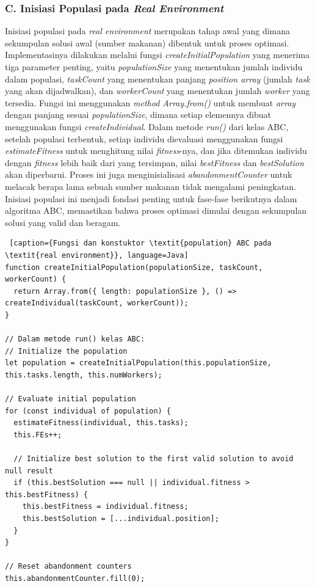 \subsubsection{C. Inisiasi Populasi pada \textit{Real Environment}}
Inisiasi populasi pada \textit{real environment} merupakan tahap awal yang dimana sekumpulan solusi awal (sumber makanan) dibentuk untuk proses optimasi. Implementasinya dilakukan melalui fungsi \textit{createInitialPopulation} yang menerima tiga parameter penting, yaitu \textit{populationSize} yang menentukan jumlah individu dalam populasi, \textit{taskCount} yang menentukan panjang \textit{position array} (jumlah \textit{task} yang akan dijadwalkan), dan \textit{workerCount} yang menentukan jumlah \textit{worker} yang tersedia. Fungsi ini menggunakan \textit{method Array.from()} untuk membuat \textit{array} dengan panjang sesuai \textit{populationSize}, dimana setiap elemennya dibuat menggunakan fungsi \textit{createIndividual}. Dalam metode \textit{run()} dari kelas ABC, setelah populasi terbentuk, setiap individu dievaluasi menggunakan fungsi \textit{estimateFitness} untuk menghitung nilai \textit{fitness}-nya, dan jika ditemukan individu dengan \textit{fitness} lebih baik dari yang tersimpan, nilai \textit{bestFitness} dan \textit{bestSolution} akan diperbarui. Proses ini juga menginisialisasi \textit{abandonmentCounter} untuk melacak berapa lama sebuah sumber makanan tidak mengalami peningkatan. Inisiasi populasi ini menjadi fondasi penting untuk fase-fase berikutnya dalam algoritma ABC, memastikan bahwa proses optimasi dimulai dengan sekumpulan solusi yang valid dan beragam.

\begin{lstlisting} [caption={Fungsi dan konstuktor \textit{population} ABC pada \textit{real environment}}, language=Java]
function createInitialPopulation(populationSize, taskCount, workerCount) {
  return Array.from({ length: populationSize }, () => createIndividual(taskCount, workerCount));
}

// Dalam metode run() kelas ABC:
// Initialize the population
let population = createInitialPopulation(this.populationSize, this.tasks.length, this.numWorkers);

// Evaluate initial population
for (const individual of population) {
  estimateFitness(individual, this.tasks);
  this.FEs++;
  
  // Initialize best solution to the first valid solution to avoid null result
  if (this.bestSolution === null || individual.fitness > this.bestFitness) {
    this.bestFitness = individual.fitness;
    this.bestSolution = [...individual.position];
  }
}

// Reset abandonment counters
this.abandonmentCounter.fill(0);
\end{lstlisting}

